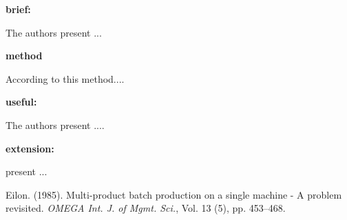 \documentclass[class=article, crop=false]{standalone}
\begin{document}
\begin{adjustwidth}{-60pt}{-30pt}
\begin{singlespace}


\begin{minipage}{\textwidth}

\begin{pabox}[label={myusecounter}]{\hfill  \cite{Eilon1985}}

\textbf{brief:}
\vspace{5pt}

The authors present ...
\vspace{5pt}

\textbf{method}
\vspace{5pt}

According to this method....
\vspace{5pt}

\textbf{useful:}
\vspace{5pt}

The authors present ....

\vspace{5pt}

\textbf{extension:}
\vspace{5pt}

\cite{Eilon1985} present ...

\tcblower



\begin{thebibliography}{00}

Eilon. (1985). Multi-product batch production on a single machine - A problem revisited. {\it OMEGA Int. J. of Mgmt. Sci.}, Vol. 13 (5), pp. 453--468.

\end{thebibliography}

\end{pabox}
\end{minipage}

\end{singlespace}
\end{adjustwidth}
\end{document}
